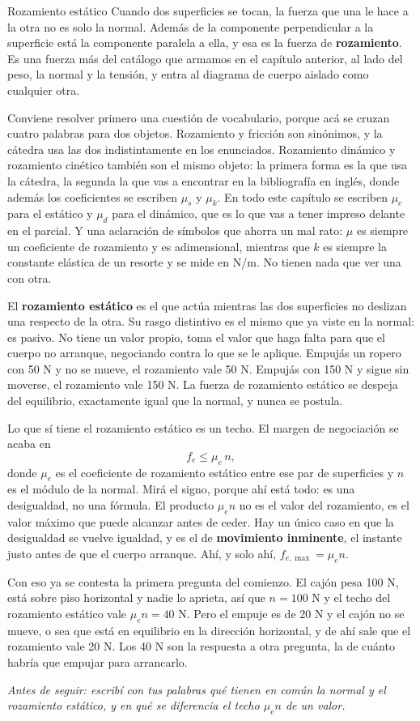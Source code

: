 \documentclass[11pt,openany]{book}
\begin{document}
\begin{bloque}{Rozamiento estático}
Cuando dos superficies se tocan, la fuerza que una le hace a la otra no es solo la normal. Además de la componente perpendicular a la superficie está la componente paralela a ella, y esa es la fuerza de \textbf{rozamiento}. Es una fuerza más del catálogo que armamos en el capítulo anterior, al lado del peso, la normal y la tensión, y entra al diagrama de cuerpo aislado como cualquier otra.

Conviene resolver primero una cuestión de vocabulario, porque acá se cruzan cuatro palabras para dos objetos. Rozamiento y fricción son sinónimos, y la cátedra usa las dos indistintamente en los enunciados. Rozamiento dinámico y rozamiento cinético también son el mismo objeto: la primera forma es la que usa la cátedra, la segunda la que vas a encontrar en la bibliografía en inglés, donde además los coeficientes se escriben $\mu_s$ y $\mu_k$. En todo este capítulo se escriben $\mu_e$ para el estático y $\mu_d$ para el dinámico, que es lo que vas a tener impreso delante en el parcial. Y una aclaración de símbolos que ahorra un mal rato: $\mu$ es siempre un coeficiente de rozamiento y es adimensional, mientras que $k$ es siempre la constante elástica de un resorte y se mide en N/m. No tienen nada que ver una con otra.

El \textbf{rozamiento estático} es el que actúa mientras las dos superficies no deslizan una respecto de la otra. Su rasgo distintivo es el mismo que ya viste en la normal: es pasivo. No tiene un valor propio, toma el valor que haga falta para que el cuerpo no arranque, negociando contra lo que se le aplique. Empujás un ropero con 50 N y no se mueve, el rozamiento vale 50 N. Empujás con 150 N y sigue sin moverse, el rozamiento vale 150 N. La fuerza de rozamiento estático se despeja del equilibrio, exactamente igual que la normal, y nunca se postula.

Lo que sí tiene el rozamiento estático es un techo. El margen de negociación se acaba en
\[
f_e \le \mu_e\, n ,
\]
donde $\mu_e$ es el coeficiente de rozamiento estático entre ese par de superficies y $n$ es el módulo de la normal. Mirá el signo, porque ahí está todo: es una desigualdad, no una fórmula. El producto $\mu_e n$ no es el valor del rozamiento, es el valor máximo que puede alcanzar antes de ceder. Hay un único caso en que la desigualdad se vuelve igualdad, y es el de \textbf{movimiento inminente}, el instante justo antes de que el cuerpo arranque. Ahí, y solo ahí, $f_{e,\max} = \mu_e n$.

Con eso ya se contesta la primera pregunta del comienzo. El cajón pesa 100 N, está sobre piso horizontal y nadie lo aprieta, así que $n = 100$ N y el techo del rozamiento estático vale $\mu_e n = 40$ N. Pero el empuje es de 20 N y el cajón no se mueve, o sea que está en equilibrio en la dirección horizontal, y de ahí sale que el rozamiento vale 20 N. Los 40 N son la respuesta a otra pregunta, la de cuánto habría que empujar para arrancarlo.

\textit{Antes de seguir: escribí con tus palabras qué tienen en común la normal y el rozamiento estático, y en qué se diferencia el techo $\mu_e n$ de un valor.}
\end{bloque}
\end{document}
